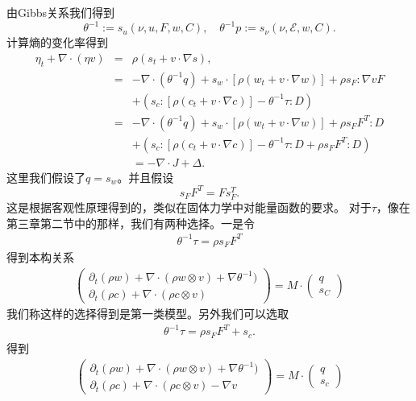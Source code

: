 \documentclass{article}
\begin{document}
由Gibbs关系我们得到
$$\theta^{-1}:=s_{u} (\nu,u,F, w,C), \quad \theta^{-1} p := s_\nu (\nu,\mathcal{E},w,C).$$
计算熵的变化率得到
\begin{eqnarray*}
		\eta_t + \nabla \cdot (\eta v) &=& \rho (s_t + v \cdot \nabla s), \\
		&=& -\nabla \cdot (\theta^{-1} q) + s_w \cdot [\rho (w_t + v \cdot \nabla w)] + \rho s_F : \nabla v F  \\
		&& + (s_c:[\rho (c_t + v \cdot \nabla c)] - \theta^{-1} \tau : D) \\
		&=& -\nabla \cdot (\theta^{-1} q) + s_w \cdot [\rho (w_t + v \cdot \nabla w)] + \rho s_F F^T : D  \\
		&& + (s_c:[\rho (c_t + v \cdot \nabla c)] - \theta^{-1} \tau : D + \rho s_F F^T : D)  \\
		&& = -\nabla \cdot J + \Delta.
\end{eqnarray*}
这里我们假设了$q=s_w$。并且假设
\begin{equation}
	s_F F^T = F s_F^T.	
\end{equation}
这是根据客观性原理得到的\cite{}，类似在固体力学中对能量函数的要求。
对于$\tau$，像在第三章第二节中的那样，我们有两种选择。一是令
\begin{eqnarray*}
\theta^{-1} \tau = \rho s_F F^T 
\end{eqnarray*}
得到本构关系
\begin{eqnarray*}
\left( \begin{array}{c} \partial_t (\rho w) + \nabla \cdot (\rho w \otimes v) + \nabla \theta^{-1}) \\
	\partial_t (\rho c) + \nabla \cdot (\rho c \otimes v) \end{array} \right)
=
M \cdot \left( \begin{array}{c} q \\ s_C \end{array} \right)
\end{eqnarray*}
我们称这样的选择得到是第一类模型。另外我们可以选取
\begin{eqnarray*}
	\theta^{-1} \tau = \rho s_F F^T + s_c.
\end{eqnarray*}
得到
\begin{eqnarray*}
\left( \begin{array}{c} \partial_t (\rho w) + \nabla \cdot (\rho w \otimes v) + \nabla \theta^{-1}) \\
	\partial_t (\rho c) + \nabla \cdot (\rho c \otimes v) - \nabla v \end{array} \right)
=
M \cdot \left( \begin{array}{c} q \\ s_c  \end{array} \right)
\end{eqnarray*}
\end{document}
